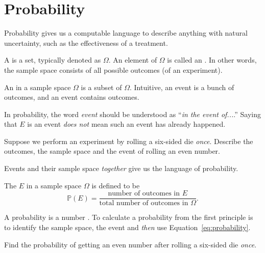 \documentclass[../main.tex]{subfiles}
\begin{document}
 \section{Probability}

Probability gives us a computable language to describe anything with natural uncertainty, such as the effectiveness of a treatment.

\begin{definition}
  A  is a set, typically denoted as \(\Omega\).  An element of \(\Omega\) is called an .   In other words, the sample space consists of all possible outcomes (of an experiment).

  An  in a sample space \(\Omega\) is a subset of \(\Omega\).  Intuitive, an event is a bunch of outcomes, and an event contains outcomes.
\end{definition}
In probability, the word \emph{event} should be understood as ``\emph{in the event of...}.'' Saying that \(E\) is an event \emph{does not} mean such an event has already happened.


\begin{example} \label{ex:probability-die-1}
  Suppose we perform an experiment by rolling a six-sided die \emph{once}.  Describe the outcomes, the sample space and the event of rolling an even number. 

\end{example}

Events and their sample space \emph{together} give us the language of probability.
\begin{definition}[probability]
  The  \(E\) in a sample space \(\Omega\) is defined to be
  \begin{equation} \label{eq:probability}
    \mathbb{P}(E) = \frac{\text{number of outcomes in \(E\)}}{\text{total number of outcomes in \(\Omega\)}}.
  \end{equation}
\end{definition}
A probability is a number \underline{\hspace{3in}}. To calculate a probability from the first principle is to identify the sample space, the event and \emph{then} use Equation~\eqref{eq:probability}.
\begin{example}
  Find the probability of getting an even number after rolling a six-sided die \emph{once}.
\end{example}
\clearpage
\end{document}
